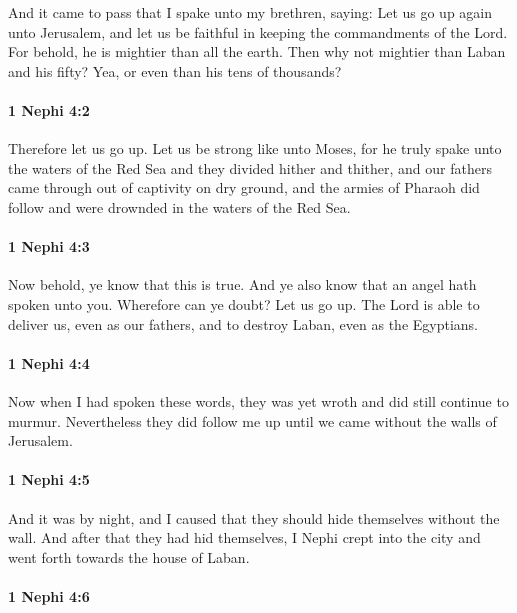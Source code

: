 			And it came to pass that I spake unto my brethren, saying:
			Let us go up again unto Jerusalem,
			and let us be faithful in keeping the commandments of the Lord.
			For behold, he is mightier than all the earth.
			Then why not mightier than Laban and his fifty?
			Yea, or even than his tens of thousands?

		\paragraph{1 Nephi 4:2} %
			\label{1NEPHI-4-2}

			Therefore let us go up.
			Let us be strong like unto Moses,
			for he truly spake unto the waters of the Red Sea
			and they divided hither and thither,
			and our fathers came through out of captivity on dry ground,
			and the armies of Pharaoh did follow
			and were drownded in the waters of the Red Sea.

		\paragraph{1 Nephi 4:3} %
			\label{1NEPHI-4-3}

			Now behold, ye know that this is true.
			And ye also know that an angel hath spoken unto you.
			Wherefore can ye doubt?
			Let us go up.
			The Lord is able to deliver us, even as our fathers,
			and to destroy Laban, even as the Egyptians.

		\paragraph{1 Nephi 4:4} %
			\label{1NEPHI-4-4}

			Now when I had spoken these words,
			they was yet wroth and did still continue to murmur.
			Nevertheless they did follow me up
			until we came without the walls of Jerusalem.

		\paragraph{1 Nephi 4:5} %
			\label{1NEPHI-4-5}

			And it was by night,
			and I caused that they should hide themselves without the wall.
			And after that they had hid themselves,
			I Nephi crept into the city and went forth towards the house of Laban.

		\paragraph{1 Nephi 4:6} %
			\label{1NEPHI-4-6}

